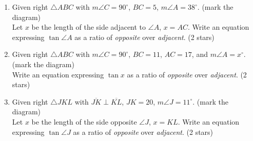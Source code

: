 \documentclass[12pt, twoside]{article}
\begin{document}
\begin{enumerate}
\newpage
  \item Given right $\triangle ABC$ with $m\angle C =90^\circ$, $BC=5$, $m\angle A=38^\circ$. (mark the diagram)\\[0.5cm]
  Let $x$ be the length of the side adjacent to $\angle A$, $x=AC$. Write an equation expressing $\tan \angle A$ as a ratio of \emph{opposite} over \emph{adjacent}. \hfill (2 stars)
    \begin{flushright}
      \end{flushright}

  \item Given right $\triangle ABC$ with $m\angle C =90^\circ$, $BC=11$, $AC=17$, and $m\angle A=x^\circ$. (mark the diagram)\\[0.5cm]
  Write an equation expressing $\tan x$ as a ratio of \emph{opposite} over \emph{adjacent}. \hfill (2 stars)
    \begin{flushright}
      \end{flushright}
  
  \item Given right $\triangle JKL$ with $\overline{JK} \perp \overline{KL}$, $JK=20$, $m\angle J=11^\circ$. (mark the diagram)\\[0.5cm]
    Let $x$ be the length of the side opposite $\angle J$, $x=KL$. Write an equation expressing $\tan \angle J$ as a ratio of \emph{opposite} over \emph{adjacent}. \hfill (2 stars)
      \begin{flushright}
        \end{flushright}
\newpage

\end{enumerate}
\end{document}
